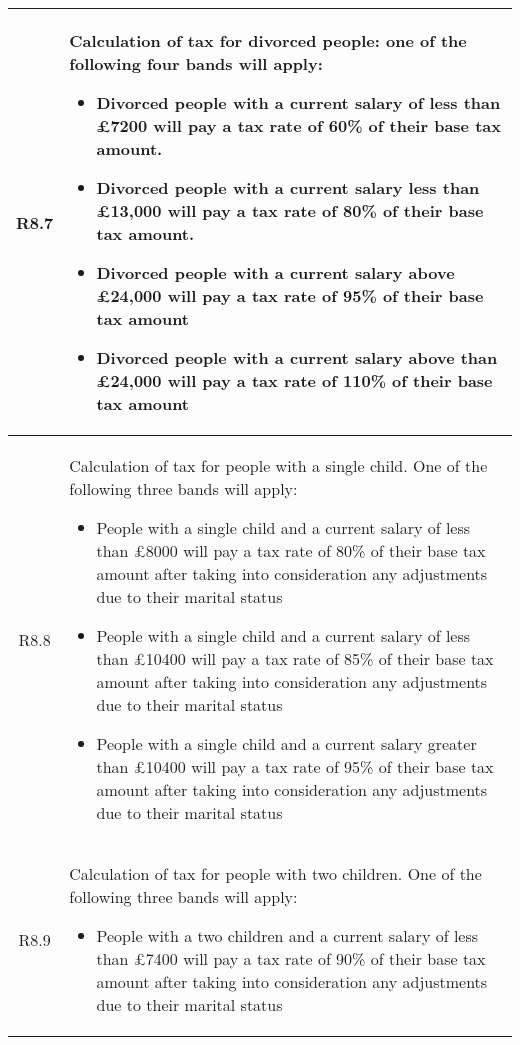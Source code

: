 \begin{table}[H]
\begin{tabularx}{\textwidth}{| c | X |}
    \hline %
    \label{req:r8-7}
    R8.7 & Calculation of tax for divorced people: one of the following four bands will apply:
    \begin{itemize}[itemsep=\tableitemsep, leftmargin=\tableleftsep]
        \item Divorced people with a current salary of less than £7200 will pay a tax rate
        of 60\% of their base tax amount.
        \item Divorced people with a current salary less than £13,000 will pay a tax rate of
        80\% of their base tax amount.
        \item Divorced people with a current salary above £24,000 will pay a tax rate of
        95\% of their base tax amount
        \item Divorced people with a current salary above than £24,000 will pay a tax rate
        of 110\% of their base tax amount
    \end{itemize}
    \\
    \hline %
    \label{req:r8-8}
    R8.8 & Calculation of tax for people with a single child. One of the following three bands will apply:
    \begin{itemize}[itemsep=\tableitemsep, leftmargin=\tableleftsep]
        \item People with a single child and a current salary of less than £8000 will pay a tax rate of 80\% of their base tax amount after taking into consideration any
        adjustments due to their marital status
        \item People with a single child and a current salary of less than £10400 will pay a
        tax rate of 85\% of their base tax amount after taking into consideration any
        adjustments due to their marital status
        \item People with a single child and a current salary greater than £10400 will pay a
        tax rate of 95\% of their base tax amount after taking into consideration any adjustments due to their marital status
    \end{itemize}
    \\
    \hline %
    \label{req:r8-9}
    R8.9 & Calculation of tax for people with two children. One of the following three bands will apply:
    \begin{itemize}[itemsep=\tableitemsep, leftmargin=\tableleftsep]
        \item People with a two children and a current salary of less than £7400 will pay a tax rate of 90\% of their base tax amount after taking into consideration any adjustments due to their marital status

\end{itemize}
\end{tabularx}
\end{table}
